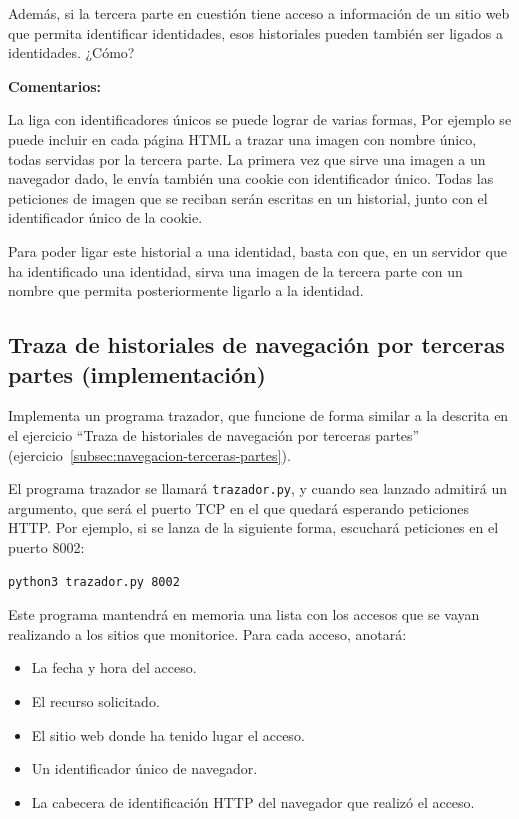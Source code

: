Además, si la tercera parte en cuestión tiene acceso a información de un sitio web que permita identificar identidades, esos historiales pueden también ser ligados a identidades. ¿Cómo?

\textbf{Comentarios:}

La liga con identificadores únicos se puede lograr de varias formas, Por ejemplo se puede incluir en cada página HTML a trazar una imagen con nombre único, todas servidas por la tercera parte. La primera vez que sirve una imagen a un navegador dado, le envía también una cookie con identificador único. Todas las peticiones de imagen que se reciban serán escritas en un historial, junto con el identificador único de la cookie.

Para poder ligar este historial a una identidad, basta con que, en un servidor que ha identificado una identidad, sirva una imagen de la tercera parte con un nombre que permita posteriormente ligarlo a la identidad.

\subsection{Traza de historiales de navegación por terceras partes (implementación)}
\label{subsec:navegacion-terceras-partes-impl}

Implementa un programa trazador, que funcione de forma similar a la descrita en el ejercicio ``Traza de historiales de navegación por terceras partes'' (ejercicio~\ref{subsec:navegacion-terceras-partes}).

El programa trazador se llamará \texttt{trazador.py}, y cuando sea lanzado admitirá un argumento, que será el puerto TCP en el que quedará esperando peticiones HTTP. Por ejemplo, si se lanza de la siguiente forma, escuchará peticiones en el puerto 8002:

\begin{verbatim}
python3 trazador.py 8002
\end{verbatim}

Este programa mantendrá en memoria una lista con los accesos que se vayan realizando a los sitios que monitorice. Para cada acceso, anotará:

\begin{itemize}
\item La fecha y hora del acceso.
\item El recurso solicitado.
\item El sitio web donde ha tenido lugar el acceso.
\item Un identificador único de navegador.
\item La cabecera de identificación HTTP del navegador que realizó el acceso.
\end{itemize}

